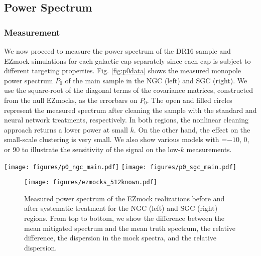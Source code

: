 \subsection{Power Spectrum}
\subsubsection{Measurement}
We now proceed to measure the power spectrum of the DR16 sample and EZmock simulations for each galactic cap separately since each cap is subject to different targeting properties. Fig. \ref{fig:p0data} shows the measured monopole power spectrum $P_{0}$ of the main sample in the NGC (left) and SGC (right). We use the square-root of the diagonal terms of the covariance matrices, constructed from the null EZmocks, as the errorbars on $P_{0}$. The open and filled circles represent the measured spectrum after cleaning the sample with the standard and neural network treatments, respectively. In both regions, the nonlinear cleaning approach returns a lower power at small $k$. On the other hand, the effect on the small-scale clustering is very small. We also show various models with \fnl=$-10$, $0$, or $90$ to illustrate the sensitivity of the signal on the low-$k$ measurements.

\begin{figure*}
    \centering
    \texttt{[image: figures/p0\_ngc\_main.pdf]}
    \texttt{[image: figures/p0\_sgc\_main.pdf]}
    \caption[Power spectrum of eBOSS quasars in the NGC and SGC.]{Monopole of the main sample in the NGC (left) and SGC (right) after treatment with the standard method and neural network. Various \fnl~models are plotted to show the sensitivity of the signal on large scales. The shades represent 1$\sigma$ statistical uncertainty estimated from the EZmocks. The x-axes are logarithmic for $k < 0.02~h{\rm Mpc}^{-1}$ and linear otherwise.}
    \label{fig:p0data}
\end{figure*}

\begin{figure}
    \centering
    \texttt{[image: figures/ezmocks\_512known.pdf]}
    \caption[Power spectrum of eBOSS mocks.]{Measured power spectrum of the EZmock realizations before and after systematic treatment for the NGC (left) and SGC (right) regions. From top to bottom, we show the difference between the mean mitigated spectrum and the mean truth spectrum, the relative difference, the dispersion in the mock spectra, and the relative dispersion.}
    \label{fig:p0mocks}
\end{figure}

